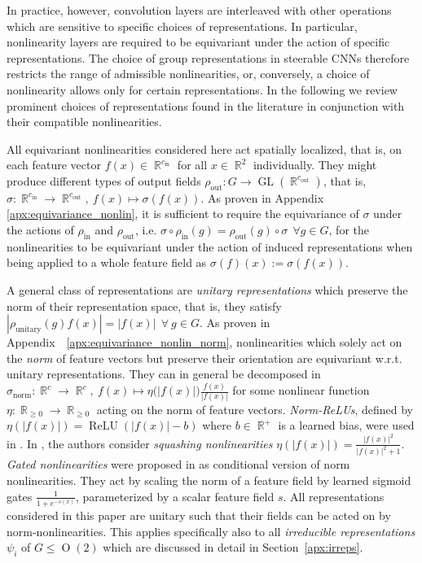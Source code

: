 \documentclass{article}
\newcommand{\apx}{Appendix\xspace
}
\DeclareMathOperator*{\R}{\mathbb{R}}
\newcommand{\GL}[1]{\ensuremath{\operatorname{GL}(#1)}}
\renewcommand{\O}[1]{\ensuremath{\operatorname{O}(#1)}}
\begin{document}
In practice, however, convolution layers are interleaved with other operations which are sensitive to specific choices of representations.
In particular, nonlinearity layers are required to be equivariant under the action of specific representations.
The choice of group representations in steerable CNNs therefore restricts the range of admissible nonlinearities, or, conversely, a choice of nonlinearity allows only for certain representations.
In the following we review prominent choices of representations found in the literature in conjunction with their compatible nonlinearities.

All equivariant nonlinearities considered here act spatially localized, that is, on each feature vector $f(x)\in\R^{c_\text{in}}$ for all $x\in\R^2$ individually.
They might produce different types of output fields ${\rho_\text{out}:G\to\GL{\R^{c_\text{out}}}}$, that is, $\sigma:\R^{c_\text{in}}\to\R^{c_\text{out}},\ f(x)\mapsto\sigma(f(x))$.
As proven in \apx \ref{apx:equivariance_nonlin}, it is sufficient to require the equivariance of $\sigma$
under the actions of $\rho_\text{in}$ and $\rho_\text{out}$, i.e. $\sigma\circ\rho_\text{in}(g)=\rho_\text{out}(g)\circ\sigma\ \ \forall g\in G$, for the nonlinearities to be equivariant under the action of induced representations
when being applied to a whole feature field as $\sigma(f)(x):=\sigma(f(x))$.

A general class of representations are \emph{unitary representations} which preserve the norm of their representation space, that is, they satisfy
$\left|\rho_\text{unitary}(g)f(x)\right| = \big|f(x)\big|\ \ \forall\ g\!\!\in\!\!G$.
As proven in \mbox{\apx~\ref{apx:equivariance_nonlin_norm}}, nonlinearities which solely act on the \emph{norm} of feature vectors but preserve their orientation are equivariant w.r.t. unitary representations.
They can in general be decomposed in
${\sigma_\text{norm}:\R^c\to\R^c,\ f(x)\mapsto\eta\big(|f(x)|\big) \frac{f(x)}{|f(x)|}}$
for some nonlinear function
$\eta:\R_{\geq0}\to\R_{\geq0}$
acting on the norm of feature vectors.
\emph{Norm-ReLUs}, defined by $\eta(|f(x)|)=\operatorname{ReLU}(|f(x)|-b)$ where $b\in\R^+$ is a learned bias, were used in \cite{Worrall2017-HNET,3d_steerableCNNs}.
In \cite{Sabour2017-DYNCAPS}, the authors consider \emph{squashing nonlinearities} $\eta(|f(x)|)=\frac{|f(x)|^2}{|f(x)|^2+1}$.
\emph{Gated nonlinearities} were proposed in \cite{3d_steerableCNNs} as conditional version of norm nonlinearities.
They act by scaling the norm of a feature field by learned sigmoid gates $\frac{1}{1+e^{-s(x)}}$, parameterized by a scalar feature field $s$.
All representations considered in this paper are unitary such that their fields can be acted on by norm-nonlinearities.
This applies specifically also to all \emph{irreducible representations} $\psi_i$ of $G\leq\O2$ which are discussed in detail in Section~\ref{apx:irreps}.
\end{document}
